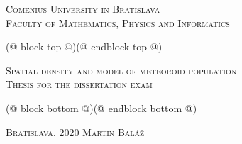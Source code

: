 \begin{titlepage}
    \begin{center}
        {
            \Large
            \textsc{Comenius University in Bratislava}\\[2mm]
            \textsc{Faculty of Mathematics, Physics and Informatics}\\[12mm]
        }

        (@ block top @)(@ endblock top @)

        {
            \linespread{1.2}
            \fontsize{30}{30}\selectfont
            \textsc{Spatial density and model of meteoroid population}\\[10mm]

            \large
            \textsc{Thesis for the dissertation exam}
        }

        (@ block bottom @)(@ endblock bottom @)

        \vfill
        {
            \large
            \textsc{Bratislava}, 2020 \hfill \textsc{Martin Baláž}
        }
    \end{center}
\end{titlepage}
